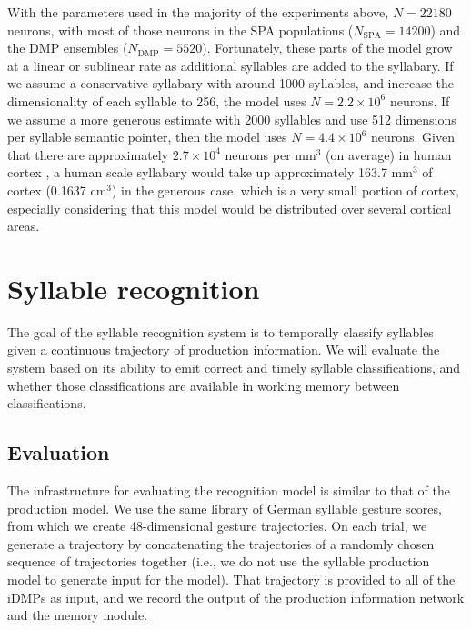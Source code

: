 With the parameters used
in the majority of the experiments above,
$N=22180$ neurons,
with most of those neurons
in the SPA populations
($N_{\text{SPA}}=14200$)
and the DMP ensembles ($N_{\text{DMP}}=5520$).
Fortunately, these parts of the model
grow at a linear or sublinear rate
as additional syllables are added
to the syllabary.
If we assume a conservative syllabary
with around 1000 syllables,
and increase the dimensionality
of each syllable to 256,
the model uses
$N=2.2 \times 10^6$ neurons.
If we assume a more generous estimate
with 2000 syllables
and use 512 dimensions
per syllable semantic pointer,
then the model uses
$N=4.4 \times 10^6$ neurons.
Given that there are approximately
$2.7 \times 10^4$ neurons per mm$^3$ (on average)
in human cortex \citep[BNID 112050]{milo2010},
a human scale syllabary would take up
approximately 163.7 mm$^3$ of cortex
(0.1637 cm$^3$)
in the generous case,
which is a very small portion of cortex,
especially considering that this model
would be distributed over
several cortical areas.

\section{Syllable recognition}

The goal of the syllable recognition system
is to temporally classify syllables
given a continuous trajectory
of production information.
We will evaluate the system
based on its ability to emit
correct and timely syllable classifications,
and whether those classifications
are available in working memory
between classifications.

\subsection{Evaluation}

The infrastructure for evaluating
the recognition model
is similar to that of the production model.
We use the same library
of German syllable gesture scores,
from which we create
48-dimensional gesture trajectories.
On each trial,
we generate a trajectory
by concatenating the trajectories
of a randomly chosen sequence
of trajectories together
(i.e., we do not use the
syllable production model
to generate input for the model).
That trajectory is provided
to all of the iDMPs as input,
and we record the output of the
production information network
and the memory module.

